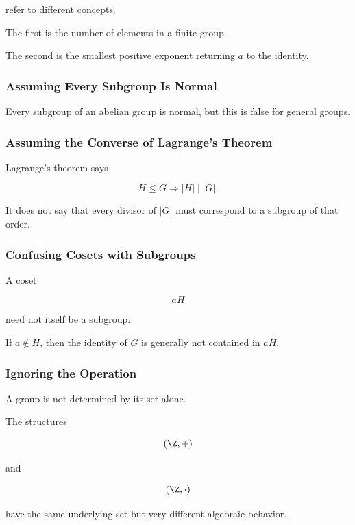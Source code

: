 refer to different concepts.

The first is the number of elements in a finite group.

The second is the smallest positive exponent returning \(a\) to the identity.

\subsubsection{Assuming Every Subgroup Is Normal}

Every subgroup of an abelian group is normal, but this is false for general
groups.

\subsubsection{Assuming the Converse of Lagrange's Theorem}

Lagrange's theorem says

\[ H\leq G\Longrightarrow |H|\mid|G|. \]

It does not say that every divisor of \(|G|\) must correspond to a subgroup
of that order.

\subsubsection{Confusing Cosets with Subgroups}

A coset

\[ aH \]

need not itself be a subgroup.

If \(a\notin H\), then the identity of \(G\) is generally not contained in
\(aH\).

\subsubsection{Ignoring the Operation}

A group is not determined by its set alone.

The structures

\[ (\Z,+) \]

and

\[ (\Z,\cdot) \]

have the same underlying set but very different algebraic behavior.

